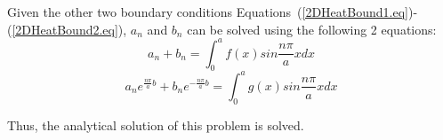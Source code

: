 Given the other two boundary conditions Equations~(\ref{2DHeatBound1.eq})-(\ref{2DHeatBound2.eq}), $a_n$ and $b_n$ can be solved using the following 2 equations:
\begin{equation}
a_n+b_n=\int_{0}^{a}f(x)sin\frac{n\pi}{a}xdx
\end{equation}
\begin{equation}
a_ne^{\frac{n\pi}{a}b}+b_ne^{-\frac{n\pi}{a}b}=\int_{0}^{a}g(x)sin\frac{n\pi}{a}xdx
\end{equation}

Thus, the analytical solution of this problem is solved.















